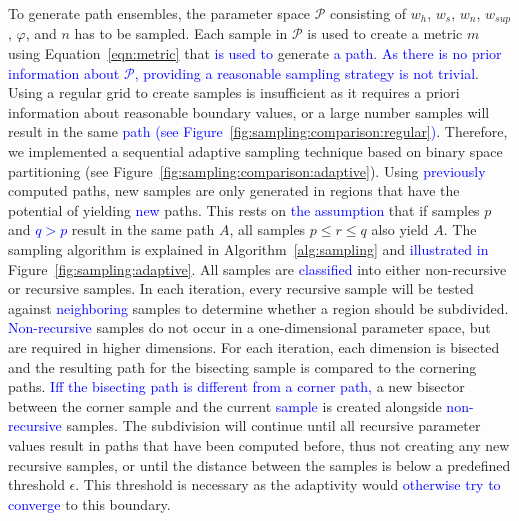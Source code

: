 \documentclass{egpubl}
\newcommand{\diff}[1]{\textcolor{blue}{#1}}
\begin{document}
To generate path ensembles, the parameter space $\mathcal{P}$ consisting of $w_h$, $w_s$, $w_n$, $w_{sup}$, $\varphi$, and $n$ has to be sampled. Each sample in $\mathcal{P}$ is used to create a metric $m$ using Equation~\ref{eqn:metric} that \diff{is used to} generate \diff{a path}. \diff{As there is no prior information about $\mathcal{P}$, providing a reasonable sampling strategy is not trivial}. Using a regular grid to create samples is insufficient as it requires a priori information about reasonable boundary values, or a large number samples will result in the same \diff{path (see Figure~\ref{fig:sampling:comparison:regular})}. Therefore, we implemented a sequential adaptive sampling technique based on binary space partitioning (see Figure~\ref{fig:sampling:comparison:adaptive}). Using \diff{previously} computed paths, new samples are only generated in regions that have the potential of yielding \diff{new} paths. This rests on \diff{the assumption} that if samples $p$ and \diff{$q > p$} result in the same path $A$, all samples $p \leq r \leq q$ also yield $A$. The sampling algorithm is explained in Algorithm~\ref{alg:sampling} and \diff{illustrated in} Figure~\ref{fig:sampling:adaptive}. All samples are \diff{classified} into either non-recursive or recursive samples. In each iteration, every recursive sample will be tested against \diff{neighboring} samples to determine whether a region should be subdivided. \diff{Non-recursive} samples do not occur in a one-dimensional parameter space, but are required in higher dimensions. For each iteration, each dimension is bisected and the resulting path for the bisecting sample is compared to the cornering paths. \diff{Iff the bisecting path is different from a corner path,} a new bisector between the corner sample and the current \diff{sample} is created alongside \diff{non-recursive} samples. The subdivision will continue until all recursive parameter values result in paths that have been computed before, thus not creating any new recursive samples, or until the distance between the samples is below a predefined threshold $\epsilon$. This threshold is necessary as the adaptivity would \diff{otherwise try to converge} to this boundary.
\end{document}
